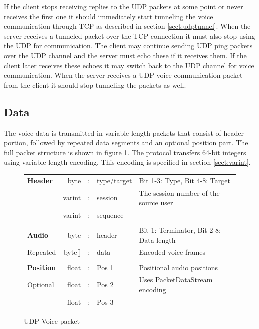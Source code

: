 \documentclass[11pt]{article} %
\begin{document}
If the client stops receiving replies to the UDP packets at some point or never receives the first one it should immediately start tunneling the voice communication through TCP as described in section \ref{sect:udptunnel}. When the server receives a tunneled packet over the TCP connection it must also stop using the UDP for communication. The client may continue sending UDP ping packets over the UDP channel and the server must echo these if it receives them. If the client later receives these echoes it may switch back to the UDP channel for voice communication. When the server receives a UDP voice communication packet from the client it should stop tunneling the packets as well.

\subsection{Data}

The voice data is transmitted in variable length packets that consist of header portion, followed by repeated data segments and an optional position part. The full packet structure is shown in figure \ref{fig:udpvoice}. The protocol transfers 64-bit integers using variable length encoding. This encoding is specified in section \ref{sect:varint}.

\begin{figure}[htp]\begin{center}\begin{tabular}{l|rcl|p{}}

\cline{2-4}
\textbf{Header} & byte &:& type/target & Bit 1-3: Type, Bit 4-8: Target \\
				\cline{2-4}
				& varint &:& session & The session number of the source user \\
				\cline{2-4}
				& varint &:& sequence & \\
				\cline{2-4}
\multicolumn{5}{c}{} \\
				\cline{2-4}
\textbf{Audio}	& byte &:& header & Bit 1: Terminator, Bit 2-8: Data length \\
				\cline{2-4}
Repeated		& byte[] &:& data & Encoded voice frames\\
				\cline{2-4}
\multicolumn{5}{c}{} \\
				\cline{2-4}

\textbf{Position} & float &:& Pos 1 & Positional audio positions \\
				\cline{2-4}
Optional		& float &:& Pos 2 & Uses PacketDataStream encoding \\
				\cline{2-4}
				& float &:& Pos 3 & \\
				\cline{2-4}

\end{tabular}
\caption{UDP Voice packet}\label{fig:udpvoice}
\end{center}\end{figure}
\end{document}
